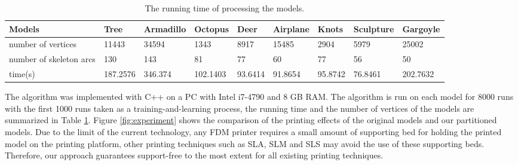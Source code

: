 \begin{table}[htb]

\begin{footnotesize}

\begin{center}

    \begin{tabular}{p{3.0cm} p{1.45cm} p{1.3cm} p{1.3cm} p{1.3cm} p{1.35cm} p{1.5cm} p{1.5cm}p{1.5cm}}

    \hline

     Models& Tree& Armadillo& Octopus& Deer& Airplane& Knots &Sculpture & Gargoyle\\ \hline
     number of vertices & 11443   & 34594   & 1343    & 8917  & 15485 & 2904    & 5979    &25002 \\ \hline
     number of skeleton arcs    &130 & 143 & 81 &77 &60 & 77 &56  &50 \\ \hline
     time(s)    &187.2576 & 346.374 & 102.1403 &93.6414 &91.8654 & 95.8742 &76.8461  &202.7632 \\
  \hline

    \end{tabular}

\end{center}

\end{footnotesize}

\caption{The running time of processing the models.}\label{tab:ertms:time}

\end{table}






The algorithm was implemented with C++ on a PC with Intel i7-4790 and 8 GB RAM. The algorithm is run on each model for 8000 runs with the first 1000 runs taken as a training-and-learning process, the running time and the number of vertices of the models are summarized in Table \ref{tab:ertms:time}. Figure \ref{fig:experiment} shows the comparison of the printing effects of the original models and our partitioned models. Due to the limit of the current technology, any FDM printer requires a small amount of supporting bed for holding the printed model on the printing platform, other printing techniques such as SLA, SLM and SLS may avoid the use of these supporting beds. Therefore, our approach guarantees support-free to the most extent for all existing printing techniques.


